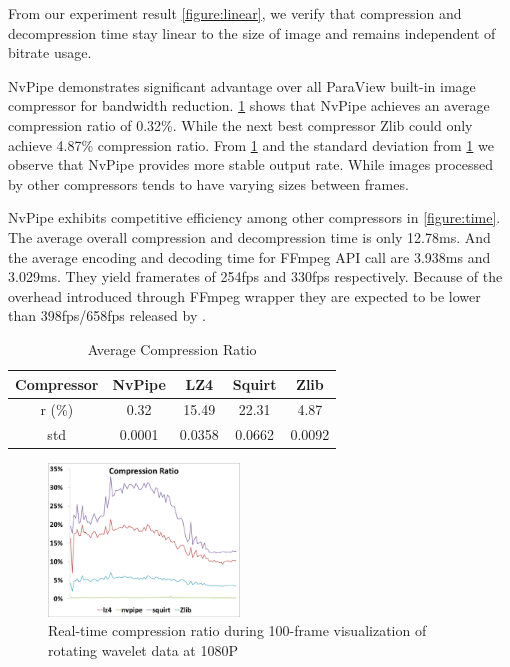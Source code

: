 \documentclass{vgtc}                          %
\begin{document}
From our experiment result \ref{figure:linear}, we verify that compression and decompression time stay linear to the size of image and remains independent of bitrate usage.

NvPipe demonstrates significant advantage over all ParaView built-in image compressor for bandwidth reduction. \ref{table:compression_ratio} shows that NvPipe achieves an average compression ratio of 0.32\%. While the next best compressor Zlib could only achieve 4.87\% compression ratio. From \ref{figure:compressRatio} and the standard deviation from \ref{table:compression_ratio} we observe that NvPipe provides more stable output rate. While images processed by other compressors tends to have varying sizes between frames.

NvPipe exhibits competitive efficiency among other compressors in \ref{figure:time}. The average overall compression and decompression time is only 12.78ms. And the average encoding and decoding time for FFmpeg API call are 3.938ms and 3.029ms. They yield framerates of 254fps and 330fps respectively. Because of the overhead introduced through FFmpeg wrapper they are expected to be lower than 398fps/658fps released by \cite{ref_1}.%

\begin{table}
  \caption{Average Compression Ratio}
  \label{table:compression_ratio}
  \scriptsize
  \begin{center}
    \begin{tabular}{ccccc}
      Compressor & NvPipe & LZ4 & Squirt & Zlib \\
    \hline
      r (\%) &  0.32 & 15.49 & 22.31 & 4.87 \\
      std & 0.0001 & 0.0358 & 0.0662 & 0.0092
    \end{tabular}
  \end{center}
\end{table}

\begin{figure}[htb]
  \label{figure:compressRatio}
  \centering
  \includegraphics[width=2.0in]{compressRatio.eps}
  \caption{Real-time compression ratio during 100-frame visualization of rotating wavelet data at 1080P}
\end{figure}
\end{document}
